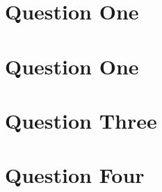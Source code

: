\documentclass[12pt]{article}
\begin{document}
\section{Question One}

\newpage

\section{Question One}

\newpage

\section{Question Three}

\newpage

\section{Question Four}
\end{document}
